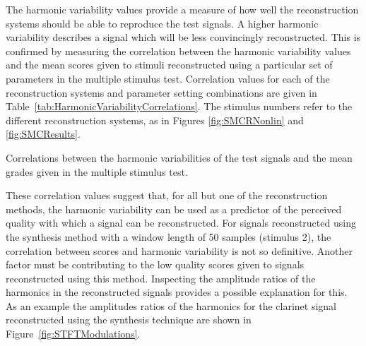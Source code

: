 		The harmonic variability values provide a measure of how well the reconstruction systems should be able to
		reproduce the test signals. A higher harmonic variability describes a signal which will be less
		convincingly reconstructed. This is confirmed by measuring the correlation between the harmonic variability
		values and the mean scores given to stimuli reconstructed using a particular set of parameters in the
		multiple stimulus test. Correlation values for each of the reconstruction systems and parameter setting
		combinations are given in Table~\ref{tab:HarmonicVariabilityCorrelations}. The stimulus numbers refer to
		the different reconstruction systems, as in Figures \ref{fig:SMCRNonlin} and \ref{fig:SMCResults}.

		\begin{table}[h!]
			\centering
			
			\caption{Correlations between the harmonic variabilities of the test signals and 
				 the mean grades given in the multiple stimulus test.}
			\label{tab:HarmonicVariabilityCorrelations}
		\end{table}

		These correlation values suggest that, for all but one of the reconstruction methods, the harmonic
		variability can be used as a predictor of the perceived quality with which a signal can be reconstructed.
		For signals reconstructed using the synthesis method with a window length of 50 samples (stimulus 2), the
		correlation between scores and harmonic variability is not so definitive. Another factor must be
		contributing to the low quality scores given to signals reconstructed using this method. Inspecting the
		amplitude ratios of the harmonics in the reconstructed signals provides a possible explanation for this.
		As an example the amplitudes ratios of the harmonics for the clarinet signal reconstructed using the
		synthesis technique are shown in Figure~\ref{fig:STFTModulations}.

